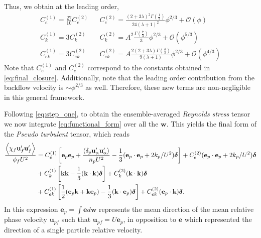 Thus, we obtain at the leading order, 
\begin{align}
    C_e^{(1)} =
    \frac{27}{10}
    C_e^{(2)}
    &&  C_e^{(2)} =
    \frac{(2+3\lambda)^2 \Gamma(\frac{1}{3})}{24(\lambda+1)^2}\phi^{2/3}
    + \mathcal{O}(\phi)
    \\
    C_k^{(1)} =
    3
    C_k^{(2)}
    && C_k^{(2)} =
    A^2 \frac{\Gamma(\frac{7}{3})}{3}\phi^{2/3}
    + \mathcal{O}(\phi^{5/3})
    \\
    C_{ek}^{(1)} =
    3
    C_{ek}^{(2)}
    && C_{ek}^{(2)} =
    A\frac{2 (2+3\lambda) \Gamma(\frac{4}{3})}{9(\lambda+1)}\phi^{2/3}
    + \mathcal{O}(\phi^{4/3})
    \label{eq:constants}
\end{align}
Note that $C_e^{(1)}$ and $C_e^{(2)}$ correspond to the constants obtained in \ref{eq:final_closure}. 
Additionally, note that the leading order contribution from the backflow velocity is $\sim \phi^{2/3}$ as well. 
Therefore, these new terms are non-negligible in this general framework. 


Following \ref{eq:step_one}, to obtain the ensemble-averaged \textit{Reynolds stress} tensor we now integrate  \ref{eq:functional_form} over all the $\textbf{w}$.
This yields the final form of the \textit{Pseudo turbulent} tensor, which reads 
\begin{align}
    \frac{\avg{\chi_f \textbf{u}_f'\textbf{u}_f'}}{\phi_f U^2}
    &= 
    C^{(1)}_e \left[
        \textbf{e}_p\textbf{e}_p
        + \frac{\pavg{\textbf{u}_\alpha'\textbf{u}_\alpha'}}{n_p U^2}
         - \frac{1}{3}(\textbf{e}_p\cdot \textbf{e}_p+2k_p/U^2)\bm\delta
    \right]
    + C^{(2)}_e 
    (\textbf{e}_p\cdot \textbf{e}_p+2k_p/U^2)\bm\delta \nonumber \\
    &+ C^{(1)}_k  \left[
        \textbf{kk}
         - \frac{1}{3}(\textbf{k}\cdot \textbf{k})\bm\delta
    \right]
    +C^{(2)}_k 
    (\textbf{k}\cdot \textbf{k})\bm\delta \nonumber \\
    &+ C^{(1)}_{ek} \left[
        \frac{1}{2}
        (\textbf{e}_p\textbf{k}  + \textbf{k} \textbf{e}_p)
         - \frac{1}{3}(\textbf{k}\cdot \textbf{e}_p)\bm\delta
    \right]
    + C^{(2)}_{ek}
    (\textbf{e}_p\cdot \textbf{k})\bm\delta. 
    \label{eq:functional_form_avg}
\end{align}
In this expression $\textbf{e}_p = \int \textbf{e} d\textbf{w} $ represents the mean direction of the mean relative phase velocity $\textbf{u}_{pf}$ such that $\textbf{u}_{pf} = U \textbf{e}_p$, in opposition to $\textbf{e}$ which represented the direction of a single particle relative velocity. 



